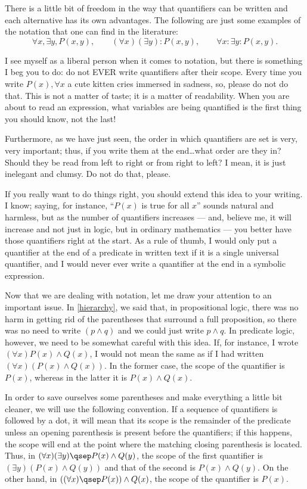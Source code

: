 \begin{para}[Notation]
\label{notaquan}
There is a little bit of freedom in the way that quantifiers can be written and each alternative has its own advantages. The following are just some examples of the notation that one can find in the literature:
\[ \forall x, \exists y, P(x,y),\qquad (\forall x)(\exists y) : P(x,y),\qquad \forall x : \exists y : P(x,y).\]

I see myself as a liberal person when it comes to notation, but there is something I beg you to do: do not EVER write quantifiers after their scope. Every time you write $P(x),\forall x$ a cute kitten cries immersed in sadness, so, please do not do that.
This is not a matter of taste; it is a matter of readability. When you are about to read an expression, what variables are being quantified is the first thing you should know, not the last!

Furthermore, as we have just seen, the order in which quantifiers are set is very, very important; thus, if you write them at the end\ldots what order are they in? Should they be read from left to right or from right to left? I mean, it is just inelegant and clumsy. Do not do that, please.

If you really want to do things right, you should extend this idea to your writing.
I know; saying, for instance, ``$P(x)$ is true for all $x$'' sounds natural and harmless, but as the number of quantifiers increases --- and, believe me, it will increase and not just in logic, but in ordinary mathematics --- you better have those quantifiers right at the start.
As a rule of thumb, I would only put a quantifier at the end of a predicate in written text if it is a single universal quantifier, and I would never ever write a quantifier at the end in a symbolic expression.


Now that we are dealing with notation, let me draw your attention to an important issue.
In \ref{hierarchy}, we said that, in propositional logic, there was no harm in getting rid of the parentheses that surround a full proposition, so there was no need to write $(p \land q)$ and we could just write $p\land q$.
In predicate logic, however, we need to be somewhat careful with this idea.
If, for instance, I wrote $(\forall x) P(x) \land Q(x)$, I would not mean the same as if I had written $(\forall x)(P(x) \land Q(x))$.
In the former case, the scope of the quantifier is $P(x)$, whereas in the latter it is $P(x)\land Q(x)$.

In order to save ourselves some parentheses and make everything a little bit cleaner, we will use the following convention.
If a sequence of quantifiers is followed by a dot, it will mean that its scope is the remainder of the predicate unless an opening parenthesis is present before the quantifiers; if this happens, the scope will end at the point where the matching closing parenthesis is located.
Thus, in $(\forall x)(\exists y)\qsep P(x)\land Q(y)$, the scope of the first quantifier is $(\exists y)(P(x) \land Q(y))$ and that of the second is $P(x) \land Q(y)$.
On the other hand, in $( (\forall x)\qsep P(x) ) \land Q(x)$, the scope of the quantifier is $P(x)$.
\end{para}


